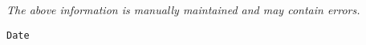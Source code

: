 \label{pkg:date}

{\tiny \it The above information is manually maintained and may contain errors.}
\begin{verbatim}
Date
\end{verbatim}
